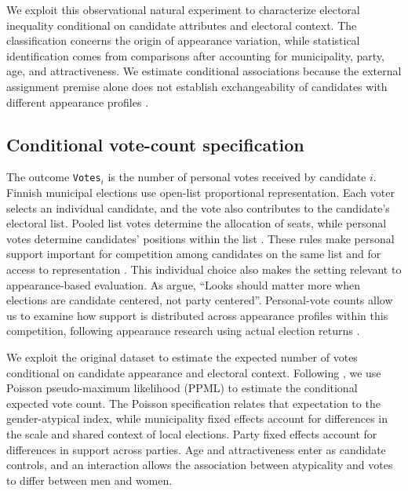 \documentclass[11pt,a4paper]{article}\usepackage[]{graphicx}\usepackage[]{xcolor}
\begin{document}
We exploit this observational natural experiment to characterize electoral inequality conditional on candidate attributes and electoral context. The classification concerns the origin of appearance variation, while statistical identification comes from comparisons after accounting for municipality, party, age, and attractiveness. We estimate conditional associations because the external assignment premise alone does not establish exchangeability of candidates with different appearance profiles \parencite[119,122--124]{Titiunik2021}.

\subsection{Conditional vote-count specification}
\label{sec:vote-model}
The outcome \texttt{Votes}$_i$ is the number of personal votes received by candidate $i$. Finnish municipal elections use open-list proportional representation. Each voter selects an individual candidate, and the vote also contributes to the candidate's electoral list. Pooled list votes determine the allocation of seats, while personal votes determine candidates' positions within the list \parencite[604,626]{HolliWass2010}. These rules make personal support important for competition among candidates on the same list and for access to representation \parencite[13,16]{SoderlundVonSchoultz2024}. This individual choice also makes the setting relevant to appearance-based evaluation. As \textcite[566]{Lawson2010a} argue, ``Looks should matter more when elections are candidate centered, not party centered''. Personal-vote counts allow us to examine how support is distributed across appearance profiles within this competition, following appearance research using actual election returns \parencite{Efran1974,Bahamonde2024}.

We exploit the original dataset to estimate the expected number of votes conditional on candidate appearance and electoral context. Following \textcite{Bahamonde2024}, we use Poisson pseudo-maximum likelihood (PPML) to estimate the conditional expected vote count. The Poisson specification relates that expectation to the gender-atypical index, while municipality fixed effects account for differences in the scale and shared context of local elections. Party fixed effects account for differences in support across parties. Age and attractiveness enter as candidate controls, and an interaction allows the association between atypicality and votes to differ between men and women.
\end{document}

